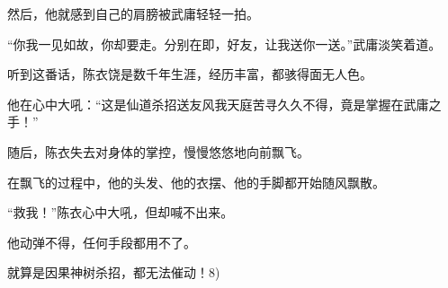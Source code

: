 \begin{this_body}
然后，他就感到自己的肩膀被武庸轻轻一拍。

“你我一见如故，你却要走。分别在即，好友，让我送你一送。”武庸淡笑着道。

听到这番话，陈衣饶是数千年生涯，经历丰富，都骇得面无人色。

他在心中大吼：“这是仙道杀招送友风我天庭苦寻久久不得，竟是掌握在武庸之手！”

随后，陈衣失去对身体的掌控，慢慢悠悠地向前飘飞。

在飘飞的过程中，他的头发、他的衣摆、他的手脚都开始随风飘散。

“救我！”陈衣心中大吼，但却喊不出来。

他动弹不得，任何手段都用不了。

就算是因果神树杀招，都无法催动！8)

\end{this_body}

